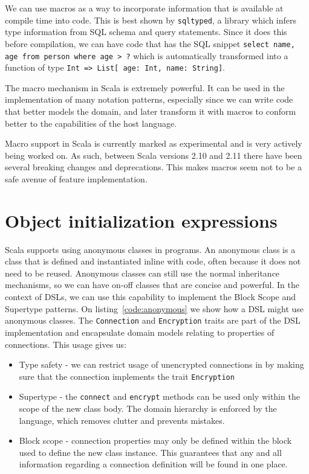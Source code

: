 We can use macros as a way to incorporate information that is available at compile time into code. This is best shown by \texttt{sqltyped}, a library which infers type information from SQL schema and query statements. Since it does this before compilation, we can have code that has the SQL snippet \texttt{select name, age from person where age > ?} which is automatically transformed into a function of type \texttt{Int => List[{ age: Int, name: String}]}.

The macro mechanism in Scala is extremely powerful. It can be used in the implementation of many notation patterns, especially since we can write code that better models the domain, and later transform it with macros to conform better to the capabilities of the host language.

Macro support in Scala is currently marked as experimental and is very actively being worked on. As such, between Scala versions 2.10 and 2.11 there have been several breaking changes and deprecations. This makes macros seem not to be a safe avenue of feature implementation.

\section{Object initialization expressions}

Scala supports using anonymous classes in programs. An anonymous class is a class that is defined and instantiated inline with code, often because it does not need to be reused. Anonymous classes can still use the normal inheritance mechanisms, so we can have on-off classes that are concise and powerful. In the context of DSLs, we can use this capability to implement the Block Scope and Supertype patterns. On listing~\ref{code:anonymous} we show how a DSL might use anonymous classes. The \texttt{Connection} and \texttt{Encryption} traits are part of the DSL implementation and encapsulate domain models relating to properties of connections. This usage gives us:
\begin{itemize}
	\item Type safety - we can restrict usage of unencrypted connections in by making sure that the connection implements the trait \texttt{Encryption}
	\item Supertype - the \texttt{connect} and \texttt{encrypt} methods can be used only within the scope of the new class body. The domain hierarchy is enforced by the language, which removes clutter and prevents mistakes.
	\item Block scope - connection properties may only be defined within the block used to define the new class instance. This guarantees that any and all information regarding a connection definition will be found in one place.
\end{itemize}

